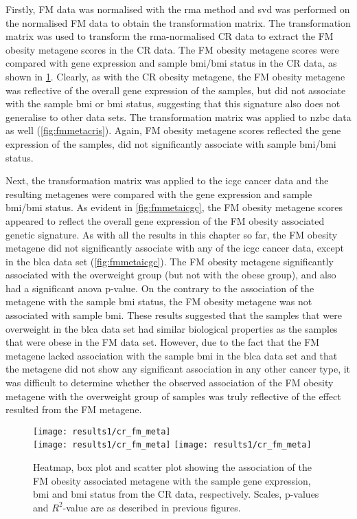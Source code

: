 Firstly, FM data was normalised with the \gls{rma} method and \gls{svd} was performed on the normalised FM data to obtain the transformation matrix.
The transformation matrix was used to transform the \gls{rma}-normalised CR data to extract the FM obesity metagene scores in the CR data.
The FM obesity metagene scores were compared with gene expression and sample \gls{bmi}/\gls{bmi} status in the CR data, as shown in \cref{fig:fmmetacr}.
Clearly, as with the CR obesity metagene, the FM obesity metagene was reflective of the overall gene expression of the samples, but did not associate with the sample \gls{bmi} or \gls{bmi} status, suggesting that this signature also does not generalise to other data sets.
The transformation matrix was applied to \gls{nzbc} data  as well (\cref{fig:fmmetacris}).
Again, FM obesity metagene scores reflected the gene expression of the samples, did not significantly associate with sample \gls{bmi}/\gls{bmi} status.

Next, the transformation matrix was applied to the \gls{icgc} cancer data and the resulting metagenes were compared with the gene expression and sample \gls{bmi}/\gls{bmi} status.
As evident in \cref{fig:fmmetaicgc}, the FM obesity metagene scores appeared to reflect the overall gene expression of the FM obesity associated genetic signature.
As with all the results in this chapter so far, the FM obesity metagene did not significantly associate with any of the \gls{icgc} cancer data, except in the \gls{blca} data set (\cref{fig:fmmetaicgc}).
The FM obesity metagene significantly associated with the overweight group (but not with the obese group), and also had a significant \gls{anova} p-value.
On the contrary to the association of the metagene with the sample \gls{bmi} status, the FM obesity metagene was not associated with sample \gls{bmi}.
These results suggested that the samples that were overweight in the \gls{blca} data set had similar biological properties as the samples that were obese in the FM data set.
However, due to the fact that the FM metagene lacked association with the sample \gls{bmi} in the \gls{blca} data set and that the metagene did not show any significant association in any other cancer type, it was difficult to determine whether the observed association of the FM obesity metagene with the overweight group of samples was truly reflective of the effect resulted from the FM metagene.
\\

\begin{figure}[htp!]
	\centering
	\texttt{[image: results1/cr\_fm\_meta]}\\
	\texttt{[image: results1/cr\_fm\_meta]}
	\hfill
	\texttt{[image: results1/cr\_fm\_meta]}
	\caption[FM obesity metagene in the CR data]{Heatmap, box plot and scatter plot showing the association of the FM obesity associated metagene with the sample gene expression, \gls{bmi} and \gls{bmi} status from the CR  data, respectively.
	Scales, p-values and $R^2$-value are as described in previous figures.}
	\label{fig:fmmetacr}
\end{figure}

